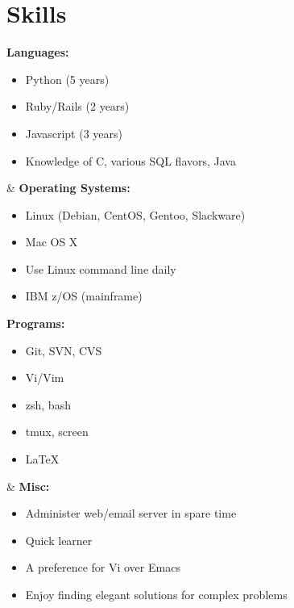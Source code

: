 
\section{Skills}
\ifskillsGrid


\begin{ncolumn}{2}
  {\bf Languages:}
  \begin{itemize}
  \item Python (5 years)
  \item Ruby/Rails (2 years)
  \item Javascript (3 years)
  \item Knowledge of C, various SQL flavors, Java
  \end{itemize}
&
  {\bf Operating Systems:}
  \begin{itemize}
  \item Linux (Debian, CentOS, Gentoo, Slackware)
  \item Mac OS X
  \item Use Linux command line daily
  \item IBM z/OS (mainframe)
  \end{itemize}
\end{ncolumn}

\begin{ncolumn}{2}
  {\bf Programs:}
  \begin{itemize}
  \item Git, SVN, CVS
  \item Vi/Vim
  \item zsh, bash
  \item tmux, screen
  \item \LaTeX
  \end{itemize}
&
  {\bf Misc:}
  \begin{itemize}
  \item Administer web/email server in spare time
  \item Quick learner
  \item A preference for Vi over Emacs
  \item Enjoy finding elegant solutions for complex problems
  \end{itemize}
\end{ncolumn}


